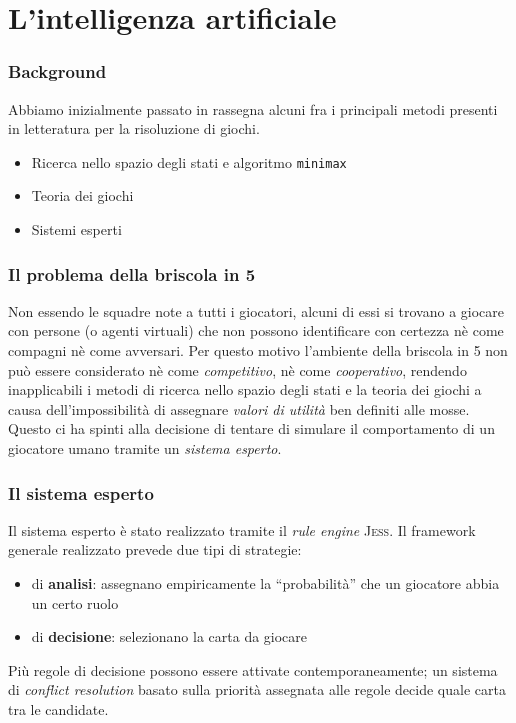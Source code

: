 \documentclass{beamer}
\newcommand*\lista{\item[$\diamondsuit$]}
\begin{document}
\section{L'intelligenza artificiale}

\begin{frame}
   \frametitle{Background}
   Abbiamo inizialmente passato in rassegna alcuni fra i principali metodi presenti in letteratura per la risoluzione di giochi.\\
   \begin{itemize}
      \lista Ricerca nello spazio degli stati e algoritmo \texttt{minimax} 
      \lista Teoria dei giochi
      \lista Sistemi esperti
   \end{itemize}
   
\end{frame}


\begin{frame}
   \frametitle{Il problema della briscola in 5}
   Non essendo le squadre note a tutti i giocatori, alcuni di essi si trovano a giocare con persone (o agenti virtuali) che non possono identificare con certezza nè come compagni nè come avversari.
   \vfill
   \pause
   Per questo motivo l'ambiente della briscola in 5 non può essere considerato nè come \emph{competitivo}, nè come \emph{cooperativo}, rendendo inapplicabili i metodi di ricerca nello spazio degli stati e la teoria dei giochi a causa dell'impossibilità di assegnare \emph{valori di utilità} ben definiti alle mosse.
   \vfill
   \pause   
   Questo ci ha spinti alla decisione di tentare di simulare il comportamento di un giocatore umano tramite un \emph{sistema esperto}.
   
\end{frame}


\begin{frame}
   \frametitle{Il sistema esperto}
   Il sistema esperto è stato realizzato tramite il \emph{rule engine} \textsc{Jess}.
   \vfill
   \pause
   Il framework generale realizzato prevede due tipi di strategie:
   \begin{itemize}
      \lista di \textbf{analisi}: assegnano empiricamente la ``probabilità'' che un giocatore abbia un certo ruolo
      \lista di \textbf{decisione}: selezionano la carta da giocare
   \end{itemize}
   \vfill
   \pause
   Più regole di decisione possono essere attivate contemporaneamente; un sistema di \emph{conflict resolution} basato sulla priorità assegnata alle regole decide quale carta tra le candidate.
\end{frame}
\end{document}

